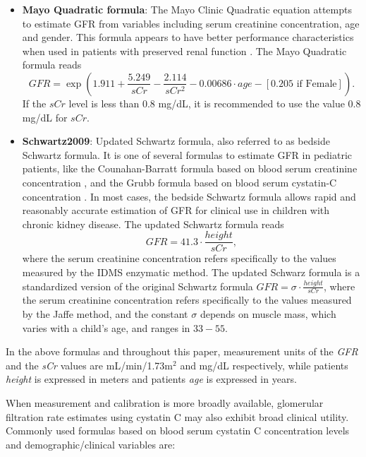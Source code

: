 \documentclass[10pt,final]{siamltex}
\begin{document}
\begin{itemize}
  \item \textbf{Mayo Quadratic formula}: The Mayo Clinic Quadratic equation attempts to estimate GFR from variables including serum creatinine concentration, age and gender. This formula appears to have better performance characteristics when used in patients with preserved renal function \cite{rigalleau,mayo}. The Mayo Quadratic formula reads
  \begin{equation}
    \textit{GFR} = \exp\left(1.911+\frac{5.249}{sCr}-\frac{2.114}{sCr^2}-0.00686\cdot age - [0.205 \text{ if Female}]\right).
  \end{equation}
  If the $sCr$ level is less than $0.8$ mg/dL, it is recommended to use the value $0.8$ mg/dL for $sCr$.

  \item \textbf{Schwartz2009}: Updated Schwartz formula, also referred to as bedside Schwartz formula. It is one of several formulas to estimate GFR in pediatric patients, like the Counahan-Barratt formula based on blood serum creatinine concentration \cite{Counahan}, and the Grubb formula based on blood serum cystatin-C concentration \cite{simonsen}. In most cases, the bedside Schwartz formula allows rapid and reasonably accurate estimation of GFR for clinical use in children with chronic kidney disease. The updated Schwartz formula reads
  \begin{equation}
    \mathit{GFR} = 41.3 \cdot \frac{height}{sCr},
  \end{equation}
  where the serum creatinine concentration refers specifically to the values measured by the IDMS enzymatic method. The updated Schwarz formula is a standardized version of the original Schwartz formula $\mathit{GFR} = \sigma \cdot \tfrac{height}{sCr}$, where the serum creatinine concentration refers specifically to the values measured by the Jaffe method, and the constant $\sigma$ depends on muscle mass, which varies with a child's age, and ranges in $33-55$.
\end{itemize}

In the above formulas and throughout this paper, measurement units of the \emph{GFR} and the \emph{sCr} values are mL/min/1.73m$^2$ and mg/dL respectively, while patients \emph{height} is expressed in meters and patients \emph{age} is expressed in years. 

When measurement and calibration is more broadly available, glomerular filtration rate estimates using cystatin C may also exhibit broad clinical utility. Commonly used formulas based on blood serum cystatin C concentration levels and demographic/clinical variables are:
\end{document}
